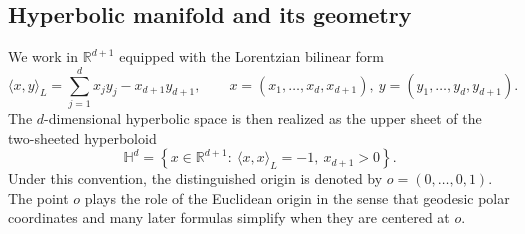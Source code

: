 \documentclass[11pt]{article}
\begin{document}
\subsection{Hyperbolic manifold and its geometry}\label{subsec:background_geometry}

We work in \(\mathbb{R}^{d+1}\) equipped with the Lorentzian bilinear form
\begin{equation}\label{eq:bg_lorentz}
\langle x,y\rangle_L
=
\sum_{j=1}^d x_j y_j - x_{d+1}y_{d+1},
\qquad
x=(x_1,\ldots,x_d,x_{d+1}),\ y=(y_1,\ldots,y_d,y_{d+1}).
\end{equation}
The \(d\)-dimensional hyperbolic space is then realized as the upper sheet of the two-sheeted hyperboloid
\begin{equation}\label{eq:bg_hyperboloid}
\mathbb{H}^d
=
\left\{
x\in\mathbb{R}^{d+1}:\ \langle x,x\rangle_L=-1,\ x_{d+1}>0
\right\}.
\end{equation}
Under this convention, the distinguished origin is denoted by $o=(0,\ldots,0,1)$.  The point \(o\) plays the role of the Euclidean origin in the sense that geodesic polar coordinates and many later formulas simplify when they are centered at \(o\).
\end{document}
